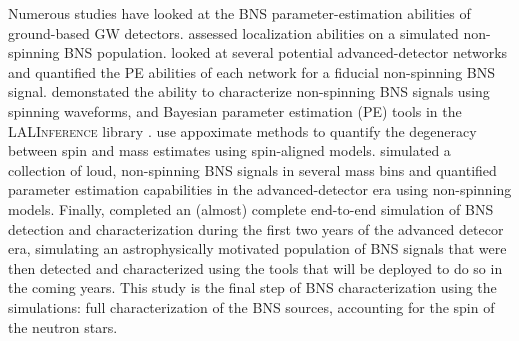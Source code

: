 Numerous studies have looked at the BNS parameter-estimation abilities of ground-based GW detectors. \citet{Nissanke_2010,Nissanke_2011} assessed localization abilities on a simulated non-spinning BNS population.  \citet{Veitch_2012} looked at several potential advanced-detector networks and quantified the PE abilities of each network for a fiducial non-spinning BNS signal.  \citet{Aasi_2013} demonstated the ability to characterize non-spinning BNS signals using spinning waveforms, and Bayesian parameter estimation (PE) tools in the \textsc{LALInference} library \cite{Veitch_2014}.   \citet{Hannam_2013} use appoximate methods to quantify the degeneracy between spin and mass estimates using spin-aligned models.  \citet{Rodriguez_2014} simulated a collection of loud, non-spinning BNS signals in several mass bins and quantified parameter estimation capabilities in the advanced-detector era using non-spinning models.  Finally, \citet{Singer_2014} completed an (almost) complete end-to-end simulation of BNS detection and characterization during the first two years of the advanced detecor era, simulating an astrophysically motivated population of BNS signals that were then detected and characterized using the tools that will be deployed to do so in the coming years.  This study is the final step of BNS characterization using the \citet{Singer_2014} simulations: full characterization of the BNS sources, accounting for the spin of the neutron stars.